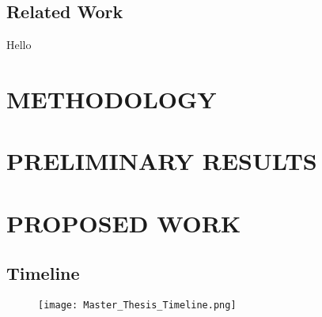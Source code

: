 \documentclass[12pt]{article}
\begin{document}
\setcounter{secnumdepth}{0} %
\subsection{Related Work}

Hello \cite{10.1145/2342441.2342467}

\setcounter{secnumdepth}{1} %

\section{METHODOLOGY}



\setcounter{secnumdepth}{2}





\section{PRELIMINARY RESULTS}



\section{PROPOSED WORK}



\newpage
\setcounter{secnumdepth}{0} %
\subsection{Timeline}

\setcounter{secnumdepth}{1} %

\begin{figure}[hbt!]
  \centering
  \texttt{[image: Master\_Thesis\_Timeline.png]}
\end{figure}

% 
\end{document}
